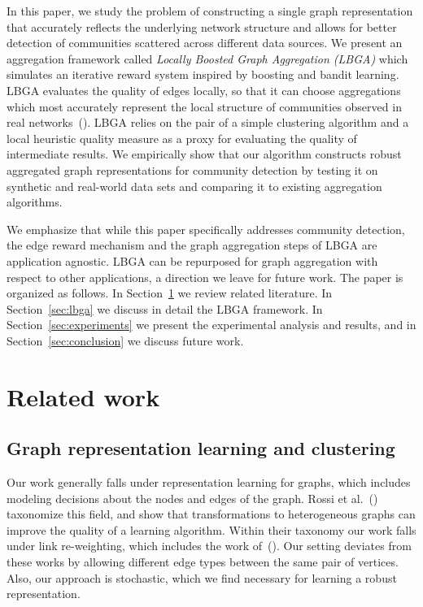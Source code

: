 \documentclass{article}
\begin{document}
In this paper, we study the problem of constructing a single graph
representation that accurately reflects the underlying network structure and
allows for better detection of communities scattered across different data
sources. We present an aggregation framework called \emph{Locally Boosted Graph
Aggregation (LBGA)} which simulates an iterative reward system inspired by
boosting and bandit learning. LBGA evaluates the quality of edges locally, so
that it can choose aggregations which most accurately represent the local
structure of communities observed in real
networks~(\cite{Aggarwal2011,Leskovec2008}). LBGA relies on the pair of a simple
clustering algorithm and a local heuristic quality measure as a proxy for
evaluating the quality of intermediate results. We empirically show that our
algorithm constructs robust aggregated graph representations for community
detection by testing it on synthetic and real-world data sets and comparing it
to existing aggregation algorithms. 

We emphasize that while this paper specifically addresses community detection,
the edge reward mechanism and the graph aggregation steps of LBGA are
application agnostic. LBGA can be repurposed for graph aggregation with respect
to other applications, a direction we leave for future work. The paper is
organized as follows. In Section~\ref{sec:related} we review related
literature. In Section~\ref{sec:lbga} we discuss in detail the LBGA framework.
In Section~\ref{sec:experiments} we present the experimental analysis and
results, and in Section~\ref{sec:conclusion} we discuss future work.

\section{Related work} 
\label{sec:related}
\subsection{Graph representation learning and clustering}
Our work generally falls under representation learning for graphs, which
includes modeling decisions about the nodes and edges of the graph. Rossi et
al.~(\cite{Rossi2012}) taxonomize this field, and show that transformations to
heterogeneous graphs can improve the quality of a learning algorithm. Within
their taxonomy our work falls under link re-weighting, which includes the work
of~(\cite{Xiang2010,Gilbert2009}). Our setting deviates from these works by 
allowing different edge types between the same pair of vertices. Also, our
approach is stochastic, which we find necessary for learning a robust
representation. 
\end{document}
